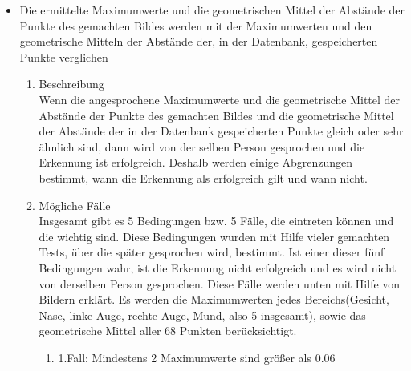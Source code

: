 \begin{enumerate}
\begin{itemize}
	Der untere Codeabschnitt \ref{fig:gm} zeigt wie dieser Schritt für die ersten 27 Punkte implementiert ist(nur um eine Idee zu haben, wie es funktioniert):

\begin{lstlisting}[caption={Berechnung des geometrischen Mittels f{\"u}r die erste 27 Punkte}, label={fig:gm},language=Python]
  for pika in range(0,27):
   dis=math.sqrt(abs(( (vleratx.item(pika)
   -float(res[vx]))))* abs( 
   (vleratx.item(pika)-float(res[vx])) ) + ( 
   abs((vleraty.item(pika)-float(res[vy])))* 
   abs((vleraty.item(pika)-float(res[vy])) ) ))
  gm *= dis
  vx+=2
  vy+=2
  gm=gm**(1/27)    
  print("GM:%s\n"%(gm))
  gm=1
  dis=0
\end{lstlisting}
	\item Die ermittelte Maximumwerte und die geometrischen Mittel der Abstände der Punkte des gemachten Bildes werden mit der Maximumwerten und den geometrische Mitteln der Abstände der, in der Datenbank, gespeicherten Punkte verglichen \\
	
	\begin{enumerate}
		\item Beschreibung \\
		
		Wenn die angesprochene Maximumwerte und die geometrische Mittel der Abstände der Punkte des gemachten Bildes und die geometrische Mittel der Abstände der in der Datenbank gespeicherten Punkte gleich oder sehr ähnlich sind, dann wird von der selben Person gesprochen und die Erkennung ist erfolgreich. Deshalb werden einige Abgrenzungen bestimmt, wann die Erkennung als erfolgreich gilt und wann nicht.
		
		\item Mögliche Fälle \\
		
		Insgesamt gibt es 5 Bedingungen bzw. 5 Fälle, die eintreten können und die wichtig sind. Diese Bedingungen wurden mit Hilfe vieler gemachten Tests, über die später gesprochen wird, bestimmt. Ist einer dieser fünf Bedingungen wahr, ist die Erkennung nicht erfolgreich und es wird nicht von derselben Person gesprochen. Diese Fälle werden unten mit Hilfe von Bildern erklärt. Es werden die Maximumwerten jedes Bereichs(Gesicht, Nase, linke Auge, rechte Auge, Mund, also 5 insgesamt), sowie das geometrische Mittel aller 68 Punkten berücksichtigt.
		
		\begin{enumerate}
			\item 1.Fall: Mindestens 2 Maximumwerte sind größer als 0.06 \\
			

\end{enumerate}
\end{enumerate}
\end{itemize}
\end{enumerate}
